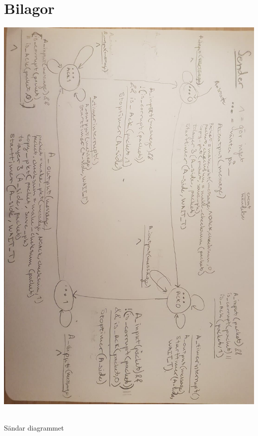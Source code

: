 \section{Bilagor}
\begin{center}
    \includegraphics[scale=0.5]{bilder/sender.jpg}
    \caption{\\Sändar diagrammet}
    \label{fig:1}
\end{center}

